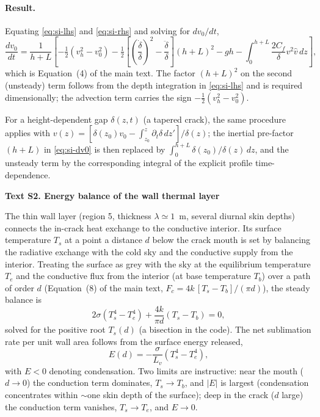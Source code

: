 \documentclass[draft,jgrga]{agutexSI2019}
\begin{document}
\begin{article}
\paragraph{Result.}
Equating \eqref{eq:si-lhs} and \eqref{eq:si-rhs} and solving for $dv_0/dt$,
\begin{equation}
    \frac{dv_0}{dt}
    = \frac{1}{h+L}\left[
      -\tfrac12\!\left(v_h^2-v_0^2\right)
      - \tfrac12\!\left[\left(\frac{\dot\delta}{\delta}\right)^{\!2} - \frac{\ddot\delta}{\delta}\right](h+L)^2
      - gh - \int_0^{h+L}\frac{2C_f}{\delta}v^2\hat v\,dz
    \right],
    \label{eq:si-dv0}
\end{equation}
which is Equation~(4) of the main text. The factor $(h+L)^2$ on the second
(unsteady) term follows from the depth integration in \eqref{eq:si-lhs} and is
required dimensionally; the advection term carries the sign $-\tfrac12(v_h^2-v_0^2)$.

For a height-dependent gap $\delta(z,t)$ (a tapered crack), the same procedure
applies with $v(z)=[\delta(z_0)v_0-\int_{z_0}^z\partial_t\delta\,dz']/\delta(z)$;
the inertial pre-factor $(h+L)$ in \eqref{eq:si-dv0} is then replaced by
$\int_0^{h+L}\delta(z_0)/\delta(z)\,dz$, and the unsteady term by the
corresponding integral of the explicit profile time-dependence.

\noindent\textbf{Text S2. Energy balance of the wall thermal layer}

The thin wall layer (region 5, thickness $\lambda\simeq1$~m, several diurnal
skin depths) connects the in-crack heat exchange to the conductive interior.
Its surface temperature $T_s$ at a point a distance $d$ below the crack mouth is
set by balancing the radiative exchange with the cold sky and the conductive
supply from the interior. Treating the surface as grey with the sky at the
equilibrium temperature $T_e$ and the conductive flux from the interior
(at base temperature $T_b$) over a path of order $d$ (Equation~(8) of the main
text, $F_c = 4k\,[T_s-T_b]/(\pi d)$), the steady balance is
\begin{equation}
    2\sigma\!\left(T_s^4 - T_e^4\right) + \frac{4k}{\pi d}\left(T_s - T_b\right) = 0 ,
    \label{eq:si-Ts}
\end{equation}
solved for the positive root $T_s(d)$ (a bisection in the code). The net
sublimation rate per unit wall area follows from the surface energy released,
\begin{equation}
    E(d) = -\frac{\sigma}{L_v}\left(T_s^4 - T_e^4\right),
    \label{eq:si-E}
\end{equation}
with $E<0$ denoting condensation. Two limits are instructive: near the mouth
($d\to0$) the conduction term dominates, $T_s\to T_b$, and $|E|$ is largest
(condensation concentrates within $\sim$one skin depth of the surface); deep in
the crack ($d$ large) the conduction term vanishes, $T_s\to T_e$, and $E\to0$.


\end{article}
\end{document}
